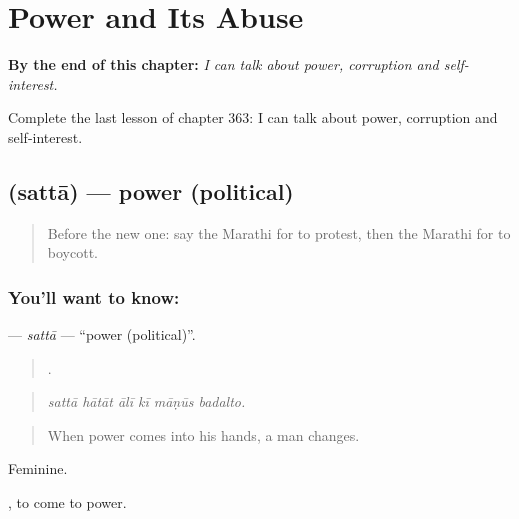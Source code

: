 
\chapter{Power and Its Abuse}
\label{ch:mr-power-and-its-abuse}

\begin{chapteropening}
\textbf{By the end of this chapter:} \emph{I can talk about power, corruption and self-interest.}

Complete the last lesson of chapter 363: I can talk about power, corruption and self-interest.
\end{chapteropening}

\section[\texorpdfstring{\mr{सत्ता} (sattā)}{सत्ता (sattā)}]{ (sattā) — power (political)}

\label{lesson:MR-C363-satta}



\begin{quote}
Before the new one: say the Marathi for to protest, then the Marathi for to boycott.
\end{quote}

\subsection*{You'll want to know: }
\textbf{} — \emph{sattā} — \textquotedblleft{}power (political)\textquotedblright{}.

\begin{quote}
     .
\end{quote}

\begin{quote}
\emph{sattā hātāt ālī kī māṇūs badalto.}
\end{quote}

\begin{quote}
When power comes into his hands, a man changes.
\end{quote}

Feminine.

 , to come to power.

